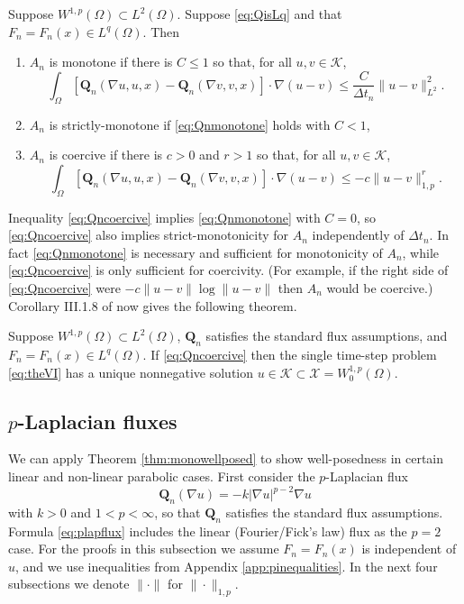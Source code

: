 \documentclass[final,onefignum]{siamart190516}
\newcommand\bQ{\mathbf{Q}}
\newcommand{\grad}{\nabla}
\begin{document}
\begin{lemma}  \label{lem:monotonecoercive}  Suppose $W^{1,p}(\Omega) \subset L^2(\Omega)$.  Suppose \eqref{eq:QisLq} and that $F_n=F_n(x) \in L^q(\Omega)$.  Then
\renewcommand{\labelenumi}{(\roman{enumi})}
\begin{enumerate}
\item  $A_n$ is monotone if there is $C\le 1$ so that, for all $u,v \in \mathcal{K}$,
\begin{equation}
\int_\Omega \left[\bQ_n(\grad u,u,x) - \bQ_n(\grad v,v,x)\right] \cdot \grad(u-v) \le \frac{C}{\Delta t_n} \|u-v\|_{L^2}^2. \label{eq:Qnmonotone}
\end{equation}
\item  $A_n$ is strictly-monotone if \eqref{eq:Qnmonotone} holds with $C<1$,
\item  $A_n$ is coercive if there is $c>0$ and $r>1$ so that, for all $u,v \in \mathcal{K}$,
\begin{equation}
\int_\Omega \left[\bQ_n(\grad u,u,x) - \bQ_n(\grad v,v,x)\right] \cdot \grad(u-v) \le - c \|u-v\|_{1,p}^r. \label{eq:Qncoercive}
\end{equation}
\end{enumerate}
\end{lemma}

Inequality \eqref{eq:Qncoercive} implies \eqref{eq:Qnmonotone} with $C=0$, so \eqref{eq:Qncoercive} also implies strict-monotonicity for $A_n$ independently of $\Delta t_n$.  In fact \eqref{eq:Qnmonotone} is necessary and sufficient for monotonicity of $A_n$, while \eqref{eq:Qncoercive} is only sufficient for coercivity.  (For example, if the right side of \eqref{eq:Qncoercive} were $- c \|u-v\| \log \|u-v\|$ then $A_n$ would be coercive.)  Corollary III.1.8 of \cite{KinderlehrerStampacchia1980} now gives the following theorem.

\begin{theorem}  \label{thm:monowellposed}  Suppose $W^{1,p}(\Omega) \subset L^2(\Omega)$, $\bQ_n$ satisfies the standard flux assumptions, and $F_n=F_n(x)\in L^q(\Omega)$.  If \eqref{eq:Qncoercive} then the single time-step problem \eqref{eq:theVI} has a unique nonnegative solution $u\in\mathcal{K} \subset \mathcal{X}=W_0^{1,p}(\Omega)$.
\end{theorem}

\subsection{$p$-Laplacian fluxes} \label{subsec:plap}  We can apply Theorem \ref{thm:monowellposed} to show well-posedness in certain linear and non-linear parabolic cases.  First consider the $p$-Laplacian \cite{Evans2010} flux
\begin{equation}
  \bQ_n(\grad u) = - k |\grad u|^{p-2} \grad u \label{eq:plapflux}
\end{equation}
with $k>0$ and $1<p<\infty$, so that $\bQ_n$ satisfies the standard flux assumptions.  Formula \eqref{eq:plapflux} includes the linear (Fourier/Fick's law) flux as the $p=2$ case.  For the proofs in this subsection we assume $F_n=F_n(x)$ is independent of $u$, and we use inequalities from Appendix \ref{app:pinequalities}.  In the next four subsections we denote $\|\cdot\|$ for $\|\cdot\|_{1,p}$.
\end{document}
